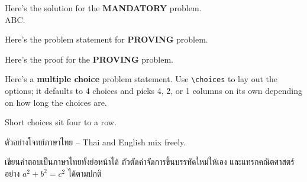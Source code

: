 \documentclass[a4paper, 10pt]{article}
\begin{document}
\begin{tosubmit}
	Here's the solution for the \textbf{MANDATORY} problem. \\
	ABC.
\end{tosubmit}

\begin{problem}
Here's the problem statement for \textbf{PROVING} problem.
\end{problem}

\begin{proofbox}
	Here's the proof for the \textbf{PROVING} problem.
\end{proofbox}

\begin{problem}
Here's a \textbf{multiple choice} problem statement. Use \verb|\choices| to lay
out the options; it defaults to 4 choices and picks 4, 2, or 1 columns on its
own depending on how long the choices are.
\begin{subproblems}
	\item Short choices sit four to a row.
\end{subproblems}
\end{problem}

\begin{problem}
\textthai{ตัวอย่างโจทย์ภาษาไทย} -- Thai and English mix freely.
\end{problem}

\begin{solution}
	\begin{thai}
		เขียนคำตอบเป็นภาษาไทยทั้งย่อหน้าได้ ตัวตัดคำจัดการขึ้นบรรทัดใหม่ให้เอง
		และแทรกคณิตศาสตร์อย่าง $a^2 + b^2 = c^2$ ได้ตามปกติ
	\end{thai}
\end{solution}
\end{document}
